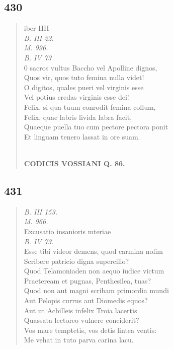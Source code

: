 \documentclass[11pt, a4paper]{report}
\begin{document}
            \subsection*{430}
      \begin{verse}
      iber IIII \\ \textit{B. III 22.} \\ \textit{M. 996.} \\ \textit{B. IV 73} \\ 0 sacros vultus Baccho vel Apolline dignos, \\ Quos vir, quos tuto femina nulla videt! \\ O digitos, quales pueri vel virginis esse \\ Vel potius credas virginis esse dei! \\ Felix, si qua tuum conrodit femina collum, \\ Felix, quae labris livida labra facit, \\ Quaeque puella tuo cum pectore pectora ponit \\ Et linguam tenero lassat in ore suam. \\ 
        ﻿\pagebreak 
    \begin{center} \textbf{CODICIS VOSSIANI Q. 86.} \end{center} \marginpar{[329]} 
      \end{verse}
  
            \subsection*{431}
      \begin{verse}
      \textit{B. III 153.} \\ \textit{M. 966.} \\ Excusatio insanioris mteriae \\ \textit{B. IV 73.} \\ Esse tibi videor demens, quod carmina nolim \\ Scribere patricio digna supercilio? \\ Quod Telamoniaden non aequo iudice victum \\ Praeteream et pugnas, Penthesilea, tuas? \\ Quod non aut magni scribam primordia mundi \\ Aut Pelopis currus aut Diomedis equos? \\ Aut  \lbrack ut \rbrack  Acbilleis infelix Troia lacertis \\ Quassata lectoreo vulnere conciderit? \\ Vos mare temptetis, vos detis lintea ventis: \\ Me vehat in tuto parva carina lacu. \\ 
      \end{verse}
  
\end{document}
